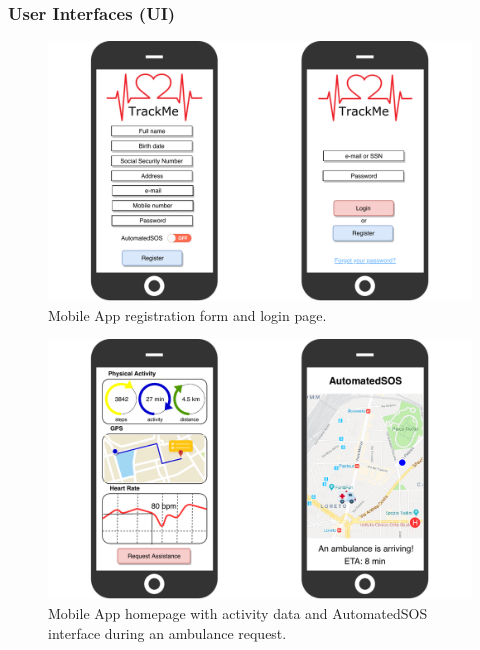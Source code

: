 \documentclass[12pt,a4paper]{article}
\begin{document}
				\subsubsection{User Interfaces (UI)}
					\begin{figure}[h]
						\centering
						\includegraphics[width=1.0\linewidth]{Images/login-registration.pdf}
						\caption{Mobile App registration form and login page.}
						\label{fig:login-registration}
					\end{figure}
					\begin{figure}[H]
						\centering
						\includegraphics[width=1.0\linewidth]{Images/pages}
						\caption{Mobile App homepage with activity data and AutomatedSOS interface during an ambulance request.}
					\end{figure}
			
\end{document}
